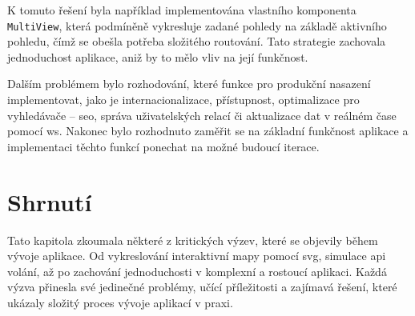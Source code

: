 K tomuto řešení byla například implementována vlastního komponenta \texttt{MultiView}, která podmíněně vykresluje zadané pohledy na základě aktivního pohledu, čímž se obešla potřeba složitého routování.
Tato strategie zachovala jednoduchost aplikace, aniž by to mělo vliv na její funkčnost.

Dalším problémem bylo rozhodování, které funkce pro produkční nasazení implementovat, jako je internacionalizace, přístupnost, optimalizace pro vyhledávače – \ac{seo}, správa uživatelských relací či aktualizace dat v reálném čase pomocí \ac{ws}\cite{mdn_api_websockets_api}.
Nakonec bylo rozhodnuto zaměřit se na základní funkčnost aplikace a implementaci těchto funkcí ponechat na možné budoucí iterace.



\section{Shrnutí}
\label{sec:vyzvy-a-problemy-shrnuti}
Tato kapitola zkoumala některé z kritických výzev, které se objevily během vývoje aplikace.
Od vykreslování interaktivní mapy pomocí \ac{svg}, simulace \ac{api} volání, až po zachování jednoduchosti v komplexní a rostoucí aplikaci.
Každá výzva přinesla své jedinečné problémy, učící příležitosti a zajímavá řešení, které ukázaly složitý proces vývoje aplikací v praxi.
